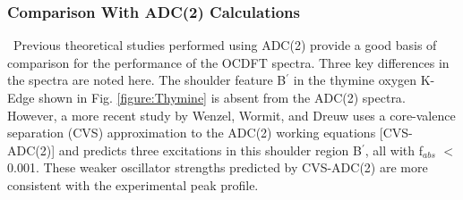\documentclass[12pt]{article}
\begin{document}
\subsubsection{Comparison With ADC(2) Calculations} \
Previous theoretical studies performed using ADC(2) provide a good basis of comparison for the performance of the OCDFT spectra. Three key differences in the spectra are noted here. 
The shoulder feature B$^{\prime}$ in the thymine oxygen K-Edge shown in Fig. \ref{figure:Thymine} is absent from the ADC(2) spectra\cite{plekan_theoretical_2008}. However, a more recent study by Wenzel, Wormit, and Dreuw \cite{wenzel_calculating_2014} uses a core-valence separation (CVS) approximation to the ADC(2) working equations [CVS-ADC(2)] and predicts three excitations in this shoulder region B$^{\prime}$, all with f$_{abs}$ $<$ 0.001. These weaker oscillator strengths predicted by CVS-ADC(2) are more consistent with the experimental peak profile.
\end{document}
